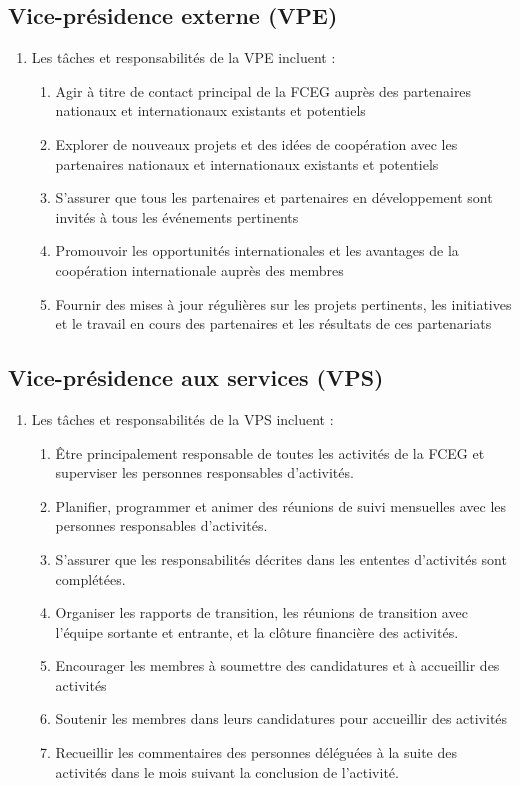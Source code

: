\subsection{Vice-présidence externe (VPE)}
\label{executif-national-vice-presidence-externe-vpe}

\begin{enumerate}
 \item Les tâches et responsabilités de la VPE incluent :
  \begin{enumerate}
   \item Agir à titre de contact principal de la FCEG auprès des partenaires nationaux et internationaux existants et potentiels
   \item Explorer de nouveaux projets et des idées de coopération avec les partenaires nationaux et internationaux existants et potentiels
   \item S'assurer que tous les partenaires et partenaires en développement sont invités à tous les événements pertinents
   \item Promouvoir les opportunités internationales et les avantages de la coopération internationale auprès des membres
   \item Fournir des mises à jour régulières sur les projets pertinents, les initiatives et le travail en cours des partenaires et les résultats de ces partenariats
  \end{enumerate}
\end{enumerate}

\subsection{Vice-présidence aux services (VPS)}
\label{executif-national-vice-presidence-aux-services-vps}

\begin{enumerate}
 \item Les tâches et responsabilités de la VPS incluent :
  \begin{enumerate}
   \item Être principalement responsable de toutes les activités de la FCEG et superviser les personnes responsables d'activités.
   \item Planifier, programmer et animer des réunions de suivi mensuelles avec les personnes responsables d'activités.
   \item S'assurer que les responsabilités décrites dans les ententes d'activités sont complétées.
   \item Organiser les rapports de transition, les réunions de transition avec l'équipe sortante et entrante, et la clôture financière des activités.
   \item Encourager les membres à soumettre des candidatures et à accueillir des activités
   \item Soutenir les membres dans leurs candidatures pour accueillir des activités
   \item Recueillir les commentaires des personnes déléguées à la suite des activités dans le mois suivant la conclusion de l'activité.
  \end{enumerate}
\end{enumerate}

